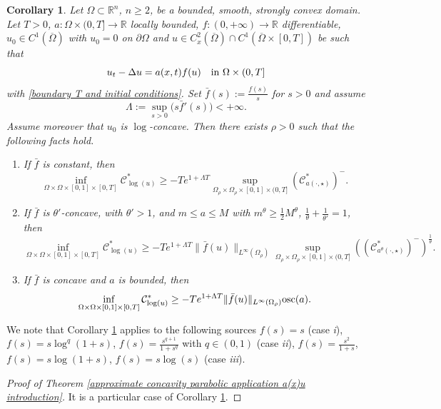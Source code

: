 \documentclass[11pt, reqno]{amsart}
\newtheorem{corollary}[lemma]{Corollary}
\theoremstyle{definition}
\numberwithin{equation}{section}
\newcommand{\Omegabar}{\overline{\Omega}}
\newcommand{\R}{\mathbb{R}}
\newcommand{\mc}[1]{\mathcal{#1}}
\newcommand{\osc}{{\rm osc}}
\def\norm#1{\|#1\|}
\begin{document}
\begin{corollary}\label{cor_korevaar_perturbed}
	Let $\Omega \subset \R^n$, $n\geq 2$, be a bounded, smooth, strongly convex domain. Let $T>0$, $a\colon\Omega\times(0,T]\to \R$ locally bounded, $f\colon(0,+\infty)\to\R$ differentiable, $u_0\in C^1(\Omegabar)$ with $u_0=0$ on $\partial\Omega$ and $u \in C^2_x(\Omegabar) \cap C^1%
	(\Omegabar\times [0,T])$ be such that
$$u_t - \Delta u = a(x,t) f(u)\quad \hbox{in $\Omega \times (0,T]$}$$
with \eqref{boundary T and initial conditions}. 
Set $\bar{f}(s):= \frac{f(s)}{s} $ for $s>0$ and assume
$$\Lambda:= \sup_{s >0} \big( s \bar{f}'(s) \big) < + \infty.$$ %
Assume moreover that $u_0$ is $\log$-concave. 
Then there exists $\rho>0$ such that the following facts hold.
\begin{enumerate}[label=\textit{\roman*})]
\item If $\bar{f}$ is constant, then 
$$\inf_{\Omega \times \Omega \times [0,1] \times [0,T]} \mc{C}^*_{\log(u)} \geq -T e^{1+\Lambda T} \sup_{\Omega_{\rho} \times \Omega_{\rho} \times [0,1] \times (0,T]} \left(\mc{C}^*_{a(\cdot, \star)}\right)^-.$$

\item If $\bar{f}$ is $\theta'$-concave, with $\theta'>1$, and $m\leq a \leq M$ with $m^{\theta} \geq \frac{1}{2} M^{\theta}$, $\frac{1}{\theta} + \frac{1}{\theta'}=1$, then 
$$\inf_{\Omega \times \Omega \times [0,1] \times [0,T]} \mc{C}^*_{\log(u)} 
\geq -T e^{1+\Lambda T}
 \norm{\bar{f}(u)}_{L^{\infty}(\Omega_{\rho})}
 \sup_{\Omega_{\rho} \times \Omega_{\rho} \times [0,1] \times (0,T]} 
 \left( \left(\mc{C}^*_{a^{\theta}(\cdot, \star)}\right)^-\right)^{\frac{1}{\theta}}.
 $$
 
 \item If $\bar{f}$ is concave and $a$ is bounded, then 
 $$\inf_{\Omega \times \Omega \times [0,1] \times [0,T]} \mc{C}^*_{\log(u)} \geq 
 -T e^{1+\Lambda T} 
 \norm{\bar{f}(u)}_{L^{\infty}(\Omega_{\rho})}
 \osc(a).
 $$
\end{enumerate}
\end{corollary}
We note that Corollary \ref{cor_korevaar_perturbed} applies to the following sources $f(s)=s$ (case \textit{i}), $f(s)=s\log^q(1+s)$, $f(s)=\frac{s^{q+1}}{1+s^q}$ with $q\in(0,1)$ (case \textit{ii}), $f(s)=\frac{s^2}{1+s}$, $f(s)=s\log(1+s)$, $f(s)=s\log(s)$ (case \textit{iii}).

\begin{proof}[Proof of Theorem \ref{approximate concavity parabolic application a(x)u introduction}]
It is a particular case of Corollary \ref{cor_korevaar_perturbed}.
\end{proof}
\end{document}
